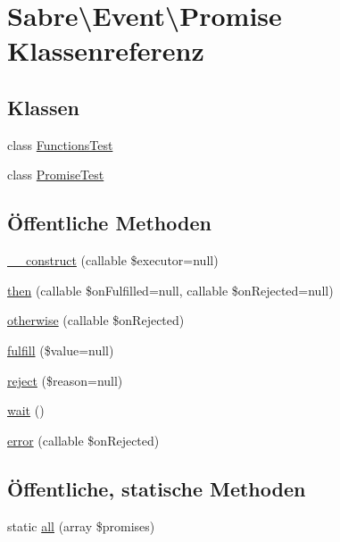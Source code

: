 \hypertarget{class_sabre_1_1_event_1_1_promise}{}\section{Sabre\textbackslash{}Event\textbackslash{}Promise Klassenreferenz}
\label{class_sabre_1_1_event_1_1_promise}
\subsection*{Klassen}
\begin{DoxyCompactItemize}
\item 
class \mbox{\hyperlink{class_sabre_1_1_event_1_1_promise_1_1_functions_test}{Functions\+Test}}
\item 
class \mbox{\hyperlink{class_sabre_1_1_event_1_1_promise_1_1_promise_test}{Promise\+Test}}
\end{DoxyCompactItemize}
\subsection*{Öffentliche Methoden}
\begin{DoxyCompactItemize}
\item 
\mbox{\hyperlink{class_sabre_1_1_event_1_1_promise_a96e07267a63bbfd68f8277405594d32f}{\+\_\+\+\_\+construct}} (callable \$executor=null)
\item 
\mbox{\hyperlink{class_sabre_1_1_event_1_1_promise_aaacfe0e7ff639e2db43db8e9143b326e}{then}} (callable \$on\+Fulfilled=null, callable \$on\+Rejected=null)
\item 
\mbox{\hyperlink{class_sabre_1_1_event_1_1_promise_aa45393483cc9bcc0feefcc53f0dba76c}{otherwise}} (callable \$on\+Rejected)
\item 
\mbox{\hyperlink{class_sabre_1_1_event_1_1_promise_a846345ad77b797c51daa024d7364c7cf}{fulfill}} (\$value=null)
\item 
\mbox{\hyperlink{class_sabre_1_1_event_1_1_promise_acea25bb367709121b776607c8d229e11}{reject}} (\$reason=null)
\item 
\mbox{\hyperlink{class_sabre_1_1_event_1_1_promise_aea21d20be6cc569fdd727bbd3c6b5dbc}{wait}} ()
\item 
\mbox{\hyperlink{class_sabre_1_1_event_1_1_promise_aced9a7533529562d138b9c02ab6d7140}{error}} (callable \$on\+Rejected)
\end{DoxyCompactItemize}
\subsection*{Öffentliche, statische Methoden}
\begin{DoxyCompactItemize}
\item 
static \mbox{\hyperlink{class_sabre_1_1_event_1_1_promise_a67f3e30bf34b8c9489f90d3633ea50e3}{all}} (array \$promises)
\end{DoxyCompactItemize}
